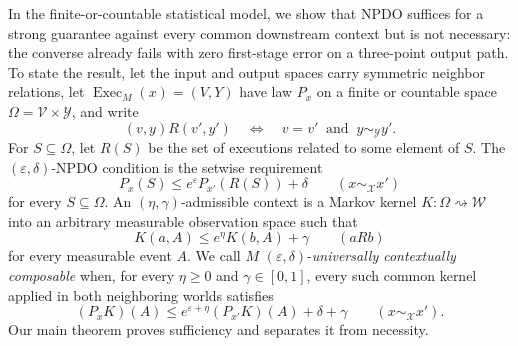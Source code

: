 \documentclass[11pt]{article}
\begin{document}
In the finite-or-countable statistical model, we show that NPDO suffices for a
strong guarantee against every common downstream context but is not necessary:
the converse already fails with zero first-stage error on a three-point output
path.  To state the result, let the input and output spaces carry symmetric
neighbor relations, let
$\operatorname{Exec}_M(x)=(V,Y)$ have law $P_x$ on a finite or countable
space $\Omega=\mathcal V\times\mathcal Y$, and write
\[
 (v,y)R(v',y')
 \quad\Longleftrightarrow\quad
 v=v'\ \text{ and }\ y\sim_{\mathcal Y}y'.
\]
For $S\subseteq\Omega$, let $R(S)$ be the set of executions related to some
element of $S$.  The $(\varepsilon,\delta)$-NPDO condition is the setwise
requirement
\[
 P_x(S)\leq e^\varepsilon P_{x'}(R(S))+\delta
 \qquad(x\sim_{\mathcal X}x')
\]
for every $S\subseteq\Omega$.  An $(\eta,\gamma)$-admissible context is a
Markov kernel
$K:\Omega\rightsquigarrow\mathcal W$ into an arbitrary measurable observation
space such that
\[
 K(a,A)\leq e^\eta K(b,A)+\gamma
 \qquad(aRb)
\]
for every measurable event $A$.  We call $M$
$(\varepsilon,\delta)$-\emph{universally contextually composable} when, for
every $\eta\geq0$ and $\gamma\in[0,1]$, every such common kernel applied in
both neighboring worlds satisfies
\[
 (P_xK)(A)
 \leq e^{\varepsilon+\eta}(P_{x'}K)(A)+\delta+\gamma
 \qquad(x\sim_{\mathcal X}x').
\]
Our main theorem proves sufficiency and separates it from necessity.
\end{document}
